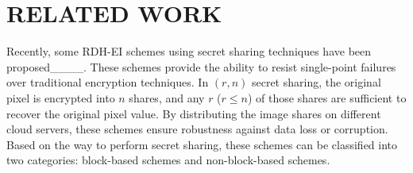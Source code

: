 \section{RELATED WORK}
\label{sec:related work}
Recently, some RDH-EI schemes using secret sharing techniques have been proposed____. These schemes provide the ability to resist single-point failures over traditional encryption techniques. In $(r,n)$ secret sharing, the original pixel is encrypted into $n$ shares, and any $r$ ($r\leq n$) of those shares are sufficient to recover the original pixel value. By distributing the image shares on different cloud servers, these schemes ensure robustness against data loss or corruption. Based on the way to perform secret sharing, these schemes can be classified into two categories: block-based schemes and non-block-based schemes.

